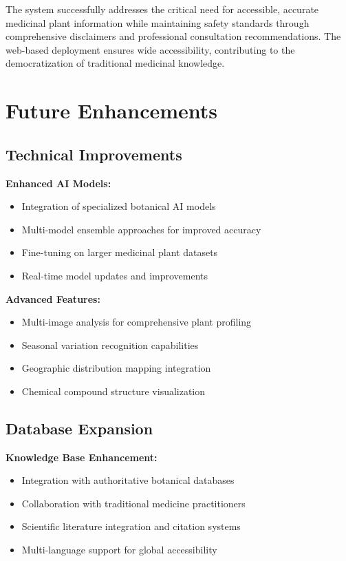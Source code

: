 \documentclass[conference]{IEEEtran}
\begin{document}
The system successfully addresses the critical need for accessible, accurate medicinal plant information while maintaining safety standards through comprehensive disclaimers and professional consultation recommendations. The web-based deployment ensures wide accessibility, contributing to the democratization of traditional medicinal knowledge.

\section{Future Enhancements}

\subsection{Technical Improvements}

\textbf{Enhanced AI Models:}
\begin{itemize}
\item Integration of specialized botanical AI models
\item Multi-model ensemble approaches for improved accuracy
\item Fine-tuning on larger medicinal plant datasets
\item Real-time model updates and improvements
\end{itemize}

\textbf{Advanced Features:}
\begin{itemize}
\item Multi-image analysis for comprehensive plant profiling
\item Seasonal variation recognition capabilities
\item Geographic distribution mapping integration
\item Chemical compound structure visualization
\end{itemize}

\subsection{Database Expansion}

\textbf{Knowledge Base Enhancement:}
\begin{itemize}
\item Integration with authoritative botanical databases
\item Collaboration with traditional medicine practitioners
\item Scientific literature integration and citation systems
\item Multi-language support for global accessibility
\end{itemize}
\end{document}
